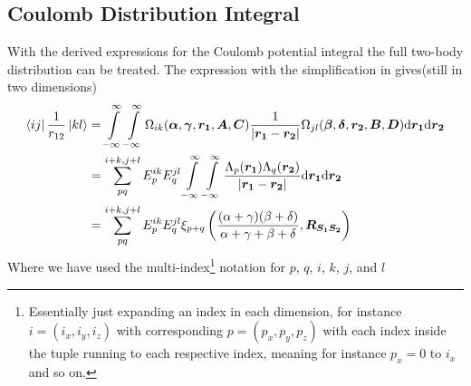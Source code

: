 \subsection{Coulomb Distribution Integral}
    With the derived expressions for the Coulomb potential integral the full
    two-body distribution can be treated. The expression with the
    simplification in  gives(still in two dimensions)
        \begin{align}
            \bra{ij}\frac{1}{r_{12}}\ket{kl} &= \infint\infint
            \Omega_{ik}(\blds{\alpha},\blds{\gamma},\blds{r_1},
            \blds{A},\blds{C}) \frac{1}{\abs{\blds{r_1} - \blds{r_2}}}
            \Omega_{jl}(\blds{\beta},\blds{\delta},\blds{r_2},
            \blds{B},\blds{D}) \md\blds{r_1} \md\blds{r_2} \nonumber \\
            &= \suml{pq}{i+k,j+l} E^{ik}_pE^{jl}_q \infint\infint
            \frac{\Lambda_{p}(\blds{r_1})
            \Lambda_{q}(\blds{r_2})}{\abs{\blds{r_1} - \blds{r_2}}}
            \md\blds{r_1} \md\blds{r_2}\nonumber \\
            &= \suml{pq}{i+k,j+l} E^{ik}_pE^{jl}_q
            \xi_{p+q}\left(\frac{(\alpha + \gamma)(\beta + \delta)}{\alpha +
            \gamma + \beta + \delta},\blds{R_{S_1S_2}}\right)
        \end{align}
    Where we have used the multi-index\footnote{Essentially just expanding an
    index in each dimension, for instance $i=(i_x,i_y,i_z)$ with corresponding
    $p=(p_x, p_y, p_z)$ with each index inside the tuple running to each
    respective index, meaning for instance $p_x=0$ to $i_x$ and so on.}
    notation for $p$, $q$, $i$, $k$, $j$, and $l$
